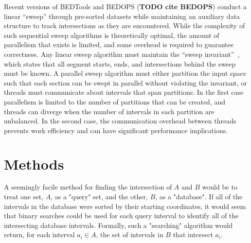 \documentclass{bioinfo}
\begin{document}
	Recent versions of BEDTools and BEDOPS (\textbf{TODO cite BEDOPS}) conduct a
	linear ``sweep'' through pre-sorted datasets while maintaining an auxiliary
	data structure to track intersections as they are encountered. While the
	complexity of such sequential sweep algorithms is theoretically optimal, the 
	amount of parallelism that exists is limited, and some overhead is required to
	guarantee correctness.  Any linear sweep algorithm must maintain the ``sweep
	invariant''~\cite{mckenney2009}, which states that all segment starts, ends, 
	and intersections behind the sweep must be known.  A parallel sweep algorithm
	must either partition the input space such that each section can be swept in
	parallel without violating the invariant, or threads must communicate 
	about intervals that span partitions.  In the first case parallelism is limited
	to the number of partitions that can be created, and threads can diverge when 
	the number of intervals in each partition are unbalanced.  In the second case,
	the communication overhead between threads prevents work efficiency and can 
	have significant performance implications.


	\section{Methods}
	
	
	A seemingly facile method for finding the intersection of
	$A$ and $B$ would be to treat one set, $A$, as a "query" set, and the
	other, $B$, as a "database". If all of the intervals in the 
	database were sorted by their starting coordinates, it would seem that binary
	searches could be used for each query interval to identify all of the intersecting
	database intervals. Formally, such a "searching" algorithm would return,
	for each interval $a_i \in A$, the set of intervals in $B$ that intersect $a_i$.
\end{document}
